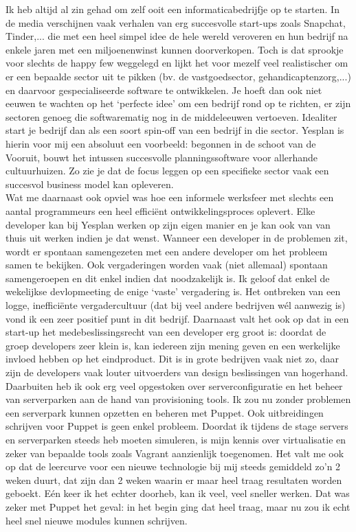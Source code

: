 \documentclass[a4paper,11pt]{article}
\theoremstyle{definition}
\begin{document}
\noindent Ik heb altijd al zin gehad om zelf ooit een informaticabedrijfje op te 
starten. In de media verschijnen vaak verhalen van erg succesvolle start-ups 
zoals Snapchat, Tinder,... die met een heel simpel idee de hele wereld veroveren en hun bedrijf na enkele jaren
met een miljoenenwinst kunnen doorverkopen. Toch is dat sprookje voor slechts de happy few weggelegd en lijkt het voor mezelf
veel realistischer om er een bepaalde sector uit te pikken (bv. de vastgoedsector, gehandicaptenzorg,...) en daarvoor
gespecialiseerde software te ontwikkelen. Je hoeft dan ook niet eeuwen te wachten op het `perfecte idee' om een bedrijf rond op te richten,
er zijn sectoren genoeg die softwarematig nog in de middeleeuwen vertoeven. Idealiter start je bedrijf dan als een soort spin-off van een bedrijf in die sector. Yesplan
 is hierin voor mij een absoluut een voorbeeld: begonnen in de schoot van de Vooruit, bouwt het intussen succesvolle planningssoftware voor allerhande
 cultuurhuizen. Zo zie je dat de focus leggen op een specifieke sector vaak een succesvol business model kan opleveren.\\

\noindent Wat me daarnaast ook opviel was hoe een informele werksfeer met slechts een aantal 
programmeurs een heel efficiënt ontwikkelingsproces oplevert. Elke developer kan bij Yesplan werken op zijn eigen manier en
je kan ook van van thuis uit werken indien je dat wenst.  Wanneer een 
developer in de problemen zit, wordt er spontaan samengezeten met een andere 
developer om het probleem samen te bekijken. Ook vergaderingen worden vaak (niet allemaal) 
spontaan samengeroepen en dit enkel indien dat noodzakelijk is. Ik geloof dat 
enkel de wekelijkse devlopmeeting de enige `vaste' vergadering is. Het ontbreken van een logge, inefficiënte vergadercultuur (dat bij veel andere bedrijven
wél aanwezig is) vond ik 
een zeer positief punt in dit bedrijf. Daarnaast valt het ook op dat in een start-up het medebeslissingsrecht van een developer erg groot is:
doordat de groep developers zeer klein is, kan iedereen zijn mening geven en een werkelijke invloed hebben op het eindproduct. Dit is in grote bedrijven vaak niet zo,
daar zijn de developers vaak louter uitvoerders van design beslissingen van hogerhand. \\

\noindent Daarbuiten heb ik ook erg veel opgestoken over serverconfiguratie en het beheer 
van serverparken aan de hand van provisioning tools. Ik zou nu zonder problemen een 
serverpark kunnen opzetten en beheren met Puppet. Ook uitbreidingen schrijven 
voor Puppet is geen enkel probleem. Doordat ik tijdens de stage servers en 
serverparken steeds heb moeten simuleren, is mijn kennis over virtualisatie en 
zeker van bepaalde tools zoals Vagrant aanzienlijk toegenomen. Het valt me ook op dat de leercurve voor een nieuwe
technologie bij mij steeds gemiddeld zo'n 2 weken duurt, dat zijn dan 2 weken waarin er maar heel traag resultaten worden geboekt. Eén keer
ik het echter doorheb, kan ik veel, veel sneller werken. Dat was zeker met Puppet het geval: in het begin ging dat heel traag, maar 
nu zou ik echt heel snel nieuwe modules kunnen schrijven.\\
\end{document}
